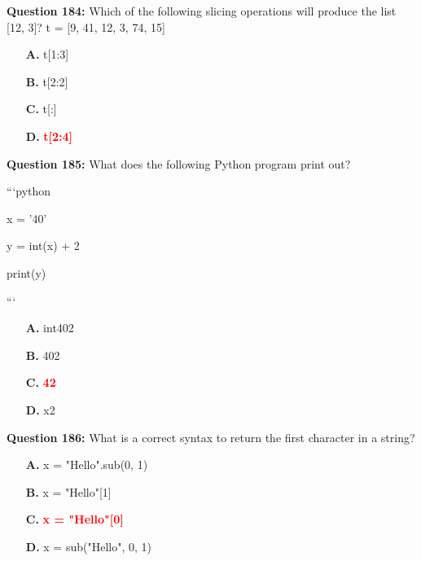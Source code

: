 \documentclass[12pt,a4paper]{article}
\begin{document}
\vspace{0.5cm}

\textbf{Question 184:} Which of the following slicing operations will produce the list [12, 3]? t = [9, 41, 12, 3, 74, 15]

\begin{itemize}
    \item[\textbf{A.}] t[1:3]
    \item[\textbf{B.}] t[2:2]
    \item[\textbf{C.}] t[:]
    \item[\textbf{D.}] \textcolor{red}{\textbf{t[2:4]}}
\end{itemize}

\vspace{0.5cm}

\textbf{Question 185:} What does the following Python program print out?\newline

\newline
\newline

\newline
```python\newline

\newline
x = '40'\newline

\newline
y = int(x) + 2\newline

\newline
print(y)\newline

\newline
```

\begin{itemize}
    \item[\textbf{A.}] int402
    \item[\textbf{B.}] 402
    \item[\textbf{C.}] \textcolor{red}{\textbf{42}}
    \item[\textbf{D.}] x2
\end{itemize}

\vspace{0.5cm}

\textbf{Question 186:} What is a correct syntax to return the first character in a string?

\begin{itemize}
    \item[\textbf{A.}] x = "Hello".sub(0, 1)
    \item[\textbf{B.}] x = "Hello"[1]
    \item[\textbf{C.}] \textcolor{red}{\textbf{x = "Hello"[0]}}
    \item[\textbf{D.}] x = sub("Hello", 0, 1)
\end{itemize}
\end{document}
